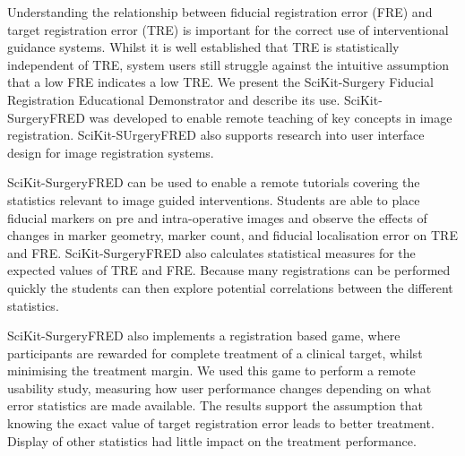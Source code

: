 Understanding the relationship between fiducial registration error (FRE) and target registration error (TRE) is important for the correct use of interventional guidance systems. Whilst it is well established that TRE is statistically independent of TRE, system users still struggle against the intuitive assumption that a low FRE indicates a low TRE. We present the SciKit-Surgery Fiducial Registration Educational Demonstrator and describe its use. SciKit-SurgeryFRED was developed to enable remote teaching of key concepts in image registration. SciKit-SUrgeryFRED also supports research into user interface design for image registration systems. 

SciKit-SurgeryFRED can be used to enable a remote tutorials covering the statistics relevant to image guided interventions. Students are able to place fiducial markers on pre and intra-operative images and observe the effects of changes in marker geometry, marker count, and fiducial localisation error on TRE and FRE. SciKit-SurgeryFRED also calculates statistical measures for the expected values of TRE and FRE. Because many registrations can be performed quickly the students can then explore potential correlations between the different statistics. 

SciKit-SurgeryFRED also implements a registration based game, where participants are rewarded for complete treatment of a clinical target, whilst minimising the treatment margin. We used this game to perform a remote usability study, measuring how user performance changes depending on what error statistics are made available. The results support the assumption that knowing the exact value of target registration error leads to better treatment. Display of other statistics had little impact on the treatment performance.  
